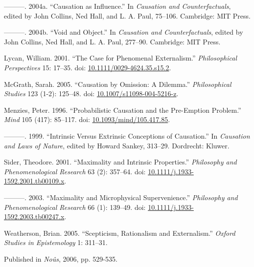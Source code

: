 \documentclass[
  10pt,
  letterpaper,
  DIV=11,
  numbers=noendperiod,
  twoside]{scrartcl}
\newlength{\cslhangindent}
\newenvironment{CSLReferences}[2] %
 {\begin{list}{}{%
  \setlength{\itemindent}{0pt}
  \setlength{\leftmargin}{0pt}
  \setlength{\parsep}{0pt}
  \ifodd #1
   \setlength{\leftmargin}{\cslhangindent}
   \setlength{\itemindent}{-1\cslhangindent}
  \fi
  \setlength{\itemsep}{#2\baselineskip}}}
 {\end{list}}
\begin{document}
\begin{CSLReferences}{1}{0}
---------. 2004a. {``Causation as Influence.''} In \emph{Causation and
Counterfactuals}, edited by John Collins, Ned Hall, and L. A. Paul,
75--106. Cambridge: {MIT} Press.

---------. 2004b. {``Void and Object.''} In \emph{Causation and
Counterfactuals}, edited by John Collins, Ned Hall, and L. A. Paul,
277--90. Cambridge: {MIT} Press.

Lycan, William. 2001. {``The Case for Phenomenal Externalism.''}
\emph{Philosophical Perspectives} 15: 17--35. doi:
\href{https://doi.org/10.1111/0029-4624.35.s15.2}{10.1111/0029-4624.35.s15.2}.

McGrath, Sarah. 2005. {``Causation by Omission: A Dilemma.''}
\emph{Philosophical Studies} 123 (1-2): 125--48. doi:
\href{https://doi.org/10.1007/s11098-004-5216-z}{10.1007/s11098-004-5216-z}.

Menzies, Peter. 1996. {``Probabilistic Causation and the Pre-Emption
Problem.''} \emph{Mind} 105 (417): 85--117. doi:
\href{https://doi.org/10.1093/mind/105.417.85}{10.1093/mind/105.417.85}.

---------. 1999. {``Intrinsic Versus Extrinsic Conceptions of
Causation.''} In \emph{Causation and Laws of Nature}, edited by Howard
Sankey, 313--29. Dordrecht: Kluwer.

Sider, Theodore. 2001. {``Maximality and Intrinsic Properties.''}
\emph{Philosophy and Phenomenological Research} 63 (2): 357--64. doi:
\href{https://doi.org/10.1111/j.1933-1592.2001.tb00109.x}{10.1111/j.1933-1592.2001.tb00109.x}.

---------. 2003. {``Maximality and Microphysical Supervenience.''}
\emph{Philosophy and Phenomenological Research} 66 (1): 139--49. doi:
\href{https://doi.org/10.1111/j.1933-1592.2003.tb00247.x}{10.1111/j.1933-1592.2003.tb00247.x}.

Weatherson, Brian. 2005. {``Scepticism, Rationalism and Externalism.''}
\emph{Oxford Studies in Epistemology} 1: 311--31.

\end{CSLReferences}



\noindent Published in\emph{
Noûs}, 2006, pp. 529-535.
\end{document}
